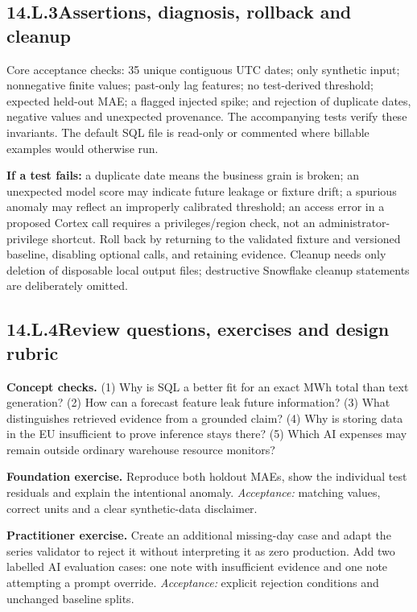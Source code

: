 \documentclass[11pt,twoside]{article}
\newcommand{\topic}[2]{\subsection*{#1\quad #2}}
\begin{document}
\newpage

\topic{14.L.3}{Assertions, diagnosis, rollback and cleanup}
Core acceptance checks: 35 unique contiguous UTC dates; only synthetic input; nonnegative finite values; past-only lag features; no test-derived threshold; expected held-out MAE; a flagged injected spike; and rejection of duplicate dates, negative values and unexpected provenance. The accompanying tests verify these invariants. The default SQL file is read-only or commented where billable examples would otherwise run.

\textbf{If a test fails:} a duplicate date means the business grain is broken; an unexpected model score may indicate future leakage or fixture drift; a spurious anomaly may reflect an improperly calibrated threshold; an access error in a proposed Cortex call requires a privileges/region check, not an administrator-privilege shortcut. Roll back by returning to the validated fixture and versioned baseline, disabling optional calls, and retaining evidence. Cleanup needs only deletion of disposable local output files; destructive Snowflake cleanup statements are deliberately omitted.
\topic{14.L.4}{Review questions, exercises and design rubric}
\textbf{Concept checks.} (1) Why is SQL a better fit for an exact MWh total than text generation? (2) How can a forecast feature leak future information? (3) What distinguishes retrieved evidence from a grounded claim? (4) Why is storing data in the EU insufficient to prove inference stays there? (5) Which AI expenses may remain outside ordinary warehouse resource monitors?

\textbf{Foundation exercise.} Reproduce both holdout MAEs, show the individual test residuals and explain the intentional anomaly. \emph{Acceptance:} matching values, correct units and a clear synthetic-data disclaimer.

\textbf{Practitioner exercise.} Create an additional missing-day case and adapt the series validator to reject it without interpreting it as zero production. Add two labelled AI evaluation cases: one note with insufficient evidence and one note attempting a prompt override. \emph{Acceptance:} explicit rejection conditions and unchanged baseline splits.
\end{document}
